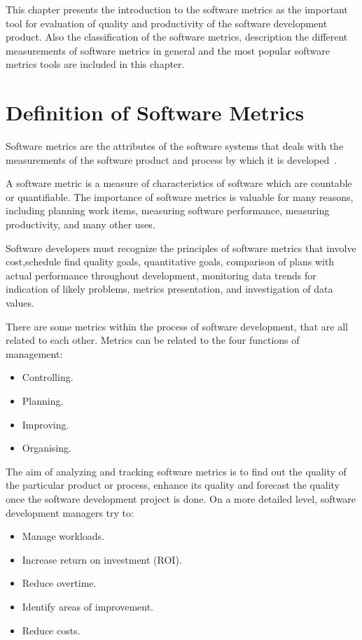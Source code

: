 This chapter presents the introduction to the software metrics as the important tool for evaluation of quality and productivity of the software development product. Also the classification of the software metrics, description the different measurements of software metrics in general and the most popular software metrics tools are included in this chapter.


\section{Definition of Software Metrics}

Software metrics are the attributes of the software systems that deals with the measurements of the software product and process by which it is developed~\cite{metrix}.
 
A software metric is a measure of characteristics of software which are countable or quantifiable. The importance of software metrics is valuable for many reasons, including planning work items, measuring software performance, measuring productivity, and many other uses.

Software developers must recognize the principles of software metrics that involve cost,schedule find quality goals, quantitative goals, comparison of plans with actual performance throughout development, monitoring data trends for indication of likely problems, metrics presentation, and investigation of data values.

There are some metrics within the process of software development, that are all related to each other. Metrics can be related to the four functions of management:

\begin{itemize}
	\item Controlling.
	\item Planning.
	\item Improving.
	\item Organising.
\end{itemize}

The aim of analyzing and tracking software metrics is to find out the quality of the particular product or process, enhance its quality and forecast the quality once the software development project is done. On a more detailed level, software development managers try to:

\begin{itemize}
	\item Manage workloads.
	\item Increase return on investment (ROI).
	\item Reduce overtime.
	\item Identify areas of improvement.
	\item Reduce costs.
\end{itemize}

